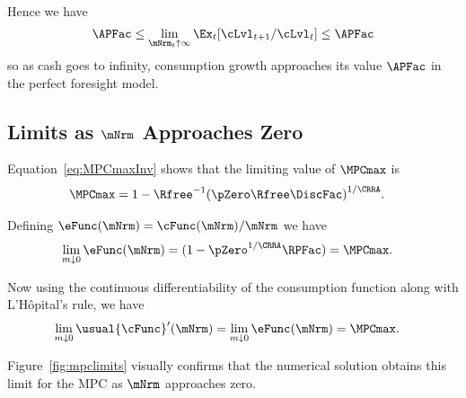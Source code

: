 \documentclass[BufferStockTheory]{subfiles}
\begin{document}
Hence we have
\begin{equation*}
  {\APFac}  \leq \lim_{\mNrm_{t} \uparrow \infty} \Ex_{t}[\cLvl_{t+1}/\cLvl_{t}] \leq {\APFac}
\end{equation*}
so as cash goes to infinity, consumption growth approaches its value $\APFac$ in the perfect foresight model.

\begin{comment}
  Of course, the constraint never becomes irrelevant if human wealth is
  infinite.  We ruled out infinite human wealth at the beginning of this
  section by assuming $\Rfree> \PermGroFac$.  If this finite human wealth
  condition does not hold, it is possible to show that for any finite
  horizon consumer the marginal propensity to consume approaches the
  finite-horizon perfect foresight MPC as wealth approaches infinity.
  However, as the horizon gets longer, the perfect foresight MPC
  approaches zero.  It can be shown therefore that the limiting MPC for
  the converged consumption function approaches (but never reaches)
  zero.  (This is why we chose $\MPCminmin=0$ if the \FHWC~fails
  in the proofs above.)
\end{comment}

\hypertarget{LimitsAsmtToZero}{}
\subsection{Limits as \texorpdfstring{$\mNrm$}{m} Approaches Zero}\label{subsec:LimitsAsmtToZero}

Equation~\eqref{eq:MPCmaxInv} shows that the limiting value of
$\MPCmax$ is
\begin{align*}
  \MPCmax  & = 1-{\Rfree}^{-1}{(\pZero  \Rfree\DiscFac)}^{1/\CRRA}.
\end{align*}

Defining $\eFunc(\mNrm)=\cFunc(\mNrm)/\mNrm$ we have
\begin{align*}
  \lim_{m \downarrow 0} \eFunc(\mNrm)  & = (1-\pZero^{1/\CRRA}\RPFac) = \MPCmax .
\end{align*}

Now using the continuous differentiability of the consumption function along with L'H\^opital's rule, we have
\begin{align*}
  \lim_{m \downarrow 0} \usual{\cFunc}^{\prime}(\mNrm)  & = \lim_{m \downarrow 0}
                                                          \eFunc(\mNrm) = \MPCmax.
\end{align*}

Figure~\ref{fig:mpclimits} visually confirms that the numerical solution obtains this limit for the MPC as $\mNrm$ approaches zero.
\end{document}
